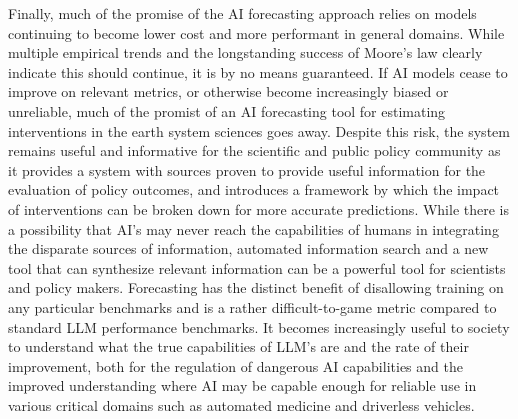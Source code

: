 \documentclass[12pt,a4paper]{article}
\begin{document}
Finally, much of the promise of the AI forecasting approach relies on models continuing to become lower cost and more performant in general domains. While multiple empirical trends and the longstanding success of Moore's law clearly indicate this should continue, it is by no means guaranteed. If AI models cease to improve on relevant metrics, or otherwise become increasingly biased or unreliable, much of the promist of an AI forecasting tool for estimating interventions in the earth system sciences goes away. Despite this risk, the system remains useful and informative for the scientific and public policy community as it provides a system with sources proven to provide useful information for the evaluation of policy outcomes, and introduces a framework by which the impact of interventions can be broken down for more accurate predictions. While there is a possibility that AI's may never reach the capabilities of humans in integrating the disparate sources of information, automated information search and a new tool that can synthesize relevant information can be a powerful tool for scientists and policy makers.
Forecasting has the distinct benefit of disallowing training on any particular benchmarks and is a rather difficult-to-game metric compared to standard LLM performance benchmarks. It becomes increasingly useful to society to understand what the true capabilities of LLM's are and the rate of their improvement, both for the regulation of dangerous AI capabilities and the improved understanding where AI may be capable enough for reliable use in various critical domains such as automated medicine and driverless vehicles.
\end{document}
